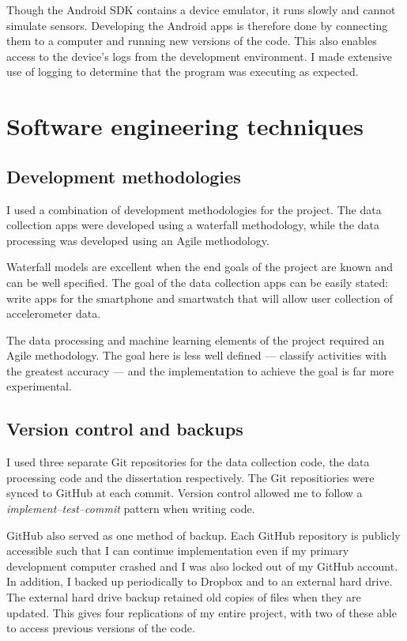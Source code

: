       Though the Android SDK contains a device emulator, it runs slowly and cannot simulate sensors. Developing the Android apps is therefore done by connecting them to a computer and running new versions of the code. This also enables access to the device's logs from the development environment. I made extensive use of logging to determine that the program was executing as expected.
  \section{Software engineering techniques}
    \subsection{Development methodologies}
      I used a combination of development methodologies for the project. The data collection apps were developed using a waterfall methodology, while the data processing was developed using an Agile methodology.
      
      Waterfall models are excellent when the end goals of the project are known and can be well specified. The goal of the data collection apps can be easily stated: write apps for the smartphone and smartwatch that will allow user collection of accelerometer data.
      
      The data processing and machine learning elements of the project required an Agile methodology. The goal here is less well defined --- classify activities with the greatest accuracy --- and the implementation to achieve the goal is far more experimental.
      
    \subsection{Version control and backups}
      I used three separate Git repositories for the data collection code, the data processing code and the dissertation respectively. The Git repositiories were synced to GitHub at each commit. Version control allowed me to follow a \emph{implement--test--commit} pattern when writing code. 
      
      GitHub also served as one method of backup. Each GitHub repository is publicly accessible such that I can continue implementation even if my primary development computer crashed and I was also locked out of my GitHub account. In addition, I backed up periodically to Dropbox and to an external hard drive. The external hard drive backup retained old copies of files when they are updated. This gives four replications of my entire project, with two of these able to access previous versions of the code.  
